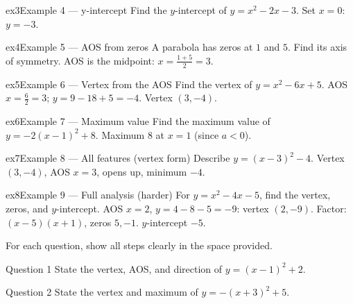 \documentclass[11pt]{article}
\begin{document}
\begin{example}{ex3}{Example 4 --- y-intercept}
Find the $y$-intercept of $y=x^2-2x-3$.
\soln Set $x=0$: $y=-3.$
\end{example}

\begin{example}{ex4}{Example 5 --- AOS from zeros}
A parabola has zeros at $1$ and $5$. Find its axis of symmetry.
\soln AOS is the midpoint: $x=\tfrac{1+5}{2}=3.$
\end{example}

\begin{example}{ex5}{Example 6 --- Vertex from the AOS}
Find the vertex of $y=x^2-6x+5$.
\soln AOS $x=\tfrac{6}{2}=3$; $y=9-18+5=-4$. Vertex $(3,-4)$.
\end{example}

\begin{example}{ex6}{Example 7 --- Maximum value}
Find the maximum value of $y=-2(x-1)^2+8$.
\soln Maximum $8$ at $x=1$ (since $a<0$).
\end{example}

\begin{example}{ex7}{Example 8 --- All features (vertex form)}
Describe $y=(x-3)^2-4$.
\soln Vertex $(3,-4)$, AOS $x=3$, opens up, minimum $-4$.
\end{example}

\begin{example}{ex8}{Example 9 --- Full analysis (harder)}
For $y=x^2-4x-5$, find the vertex, zeros, and $y$-intercept.
\soln AOS $x=2$, $y=4-8-5=-9$: vertex $(2,-9)$. Factor: $(x-5)(x+1)$, zeros $5,-1$. $y$-intercept $-5$.
\end{example}

\clearpage
{}
For each question, show all steps clearly in the space provided.

\begin{qbox}{Question 1}
State the vertex, AOS, and direction of $y=(x-1)^2+2$.\workspace{2.0cm}
\end{qbox}

\begin{qbox}{Question 2}
State the vertex and maximum of $y=-(x+3)^2+5$.\workspace{2.0cm}
\end{qbox}
\end{document}
